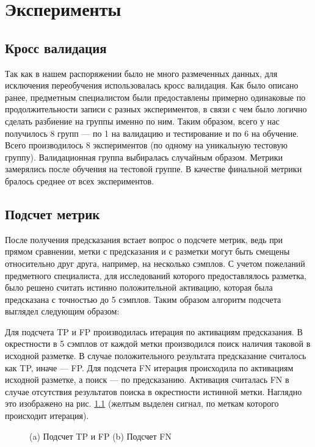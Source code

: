 \chapter{Эксперименты}

\section{Кросс валидация}
Так как в нашем распоряжении было не много размеченных данных, для исключения
переобучения использовалась кросс валидация. Как было описано ранее, предметным
специалистом были предоставлены примерно одинаковые по продолжительности записи
с разных экспериментов, в связи с чем было логично сделать разбиение на группы
именно по ним. Таким образом, всего у нас получилось 8 групп --- по 1 на
валидацию и тестирование и по 6 на обучение. Всего производилось 8
экспериментов (по одному на уникальную тестовую группу). Валидационная группа
выбиралась случайным образом. Метрики замерялись после обучения на тестовой
группе. В качестве финальной метрики бралось среднее от всех экспериментов.

\section{Подсчет метрик}

После получения предсказания встает вопрос о подсчете метрик, ведь при прямом
сравнении, метки с предсказания и с разметки могут быть смещены относительно
друг друга, например, на несколько сэмплов. С учетом пожеланий предметного
специалиста, для исследований которого предоставлялось разметка, было решено
считать истинно положительной активацию, которая была предсказана с точностью
до 5 сэмплов. Таким образом алгоритм подсчета выглядел следующим образом:

Для подсчета TP и FP производилась итерация по активациям предсказания. В
окрестности в 5 сэмплов от каждой метки производился поиск наличия таковой в
исходной разметке. В случае положительного результата предсказание считалось
как TP, иначе --- FP. Для подсчета FN итерация происходила по активациям исходной
разметке, а поиск --- по предсказанию. Активация считалась FN в случае
отсутствия результатов поиска в окрестности истинной метки. Наглядно это
изображено на рис. \ref{fig:metrics} (желтым выделен сигнал, по меткам которого
происходит итерация).

\begin{figure}[!htb]
	\centering
	\caption{(a) Подсчет TP и FP (b) Подсчет FN}
	\label{fig:metrics}
\end{figure}

